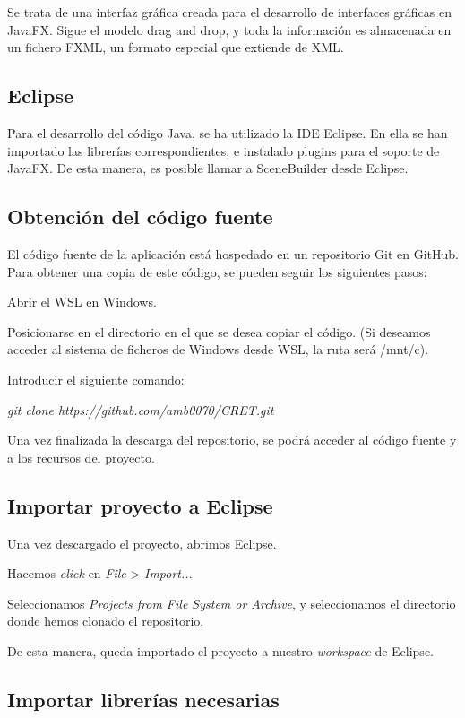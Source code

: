 Se trata de una interfaz gráfica creada para el desarrollo de interfaces gráficas en JavaFX. Sigue el modelo drag and drop, y toda la información es almacenada en un fichero FXML, un formato especial que extiende de XML.


\subsection{Eclipse}

Para el desarrollo del código Java, se ha utilizado la IDE Eclipse. En ella se han importado las librerías correspondientes, e instalado plugins para el soporte de JavaFX. De esta manera, es posible llamar a SceneBuilder desde Eclipse.


\subsection{Obtención del código fuente}

El código fuente de la aplicación está hospedado en un repositorio Git en GitHub. Para obtener una copia de este código, se pueden seguir los siguientes pasos:

Abrir el WSL en Windows.

Posicionarse en el directorio en el que se desea copiar el código. (Si deseamos acceder al sistema de ficheros de Windows desde WSL, la ruta será /mnt/c).

Introducir el siguiente comando:

\textit{git clone https://github.com/amb0070/CRET.git}

Una vez finalizada la descarga del repositorio, se podrá acceder al código fuente y a los recursos del proyecto.

\subsection{Importar proyecto a Eclipse}

Una vez descargado el proyecto, abrimos Eclipse.

Hacemos \emph{click} en \emph{File} > \emph{Import...}

Seleccionamos \emph{Projects from File System or Archive}, y seleccionamos el directorio donde hemos clonado el repositorio.

De esta manera, queda importado el proyecto a nuestro \emph{workspace} de Eclipse.


\subsection{Importar librerías necesarias}

